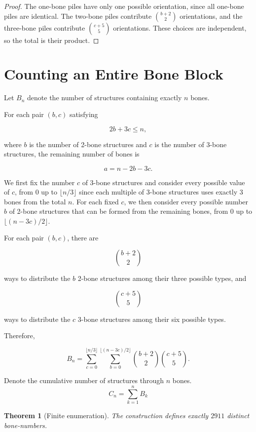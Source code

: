 \documentclass[11pt]{article}
\newtheorem{theorem}[definition]{Theorem}
\theoremstyle{remark}
\begin{document}
\begin{proof}
The one-bone piles have only one possible orientation, since all one-bone piles are identical. The two-bone piles contribute
\(\binom{b+2}{2}\) orientations, and the three-bone piles contribute
\(\binom{c+5}{5}\) orientations. These choices are independent, so the total is
their product.
\end{proof}

\section{Counting an Entire Bone Block}

Let \(B_n\) denote the number of structures containing exactly \(n\) bones.

\bigskip
For each pair \((b,c)\) satisfying

$$
2b+3c\leq n,
$$

where \(b\) is the number of 2-bone structures and \(c\) is the number of 3-bone structures, the remaining number of bones is

$$
a=n-2b-3c.
$$

We first fix the number \(c\) of 3-bone structures and consider every possible value of \(c\), from \(0\) up to \(\lfloor n/3\rfloor\) since each multiple of 3-bone structures uses exactly 3 bones from the total \(n\). For each fixed \(c\), we then consider every possible number \(b\) of 2-bone structures that can be formed from the remaining bones, from \(0\) up to \(\lfloor(n-3c)/2\rfloor\).

\bigskip
For each pair \((b,c)\), there are

$$
\binom{b+2}{2}
$$

ways to distribute the \(b\) 2-bone structures among their three possible types, and

$$
\binom{c+5}{5}
$$

ways to distribute the \(c\) 3-bone structures among their six possible types.

\bigskip
Therefore,

$$
\boxed{
B_n=
\sum_{c=0}^{\lfloor n/3\rfloor}
\sum_{b=0}^{\lfloor (n-3c)/2\rfloor}
\binom{b+2}{2}\binom{c+5}{5}
}.
$$

\bigskip
Denote the cumulative number of structures through \(n\) bones.
\[
C_n=\sum_{k=1}^{n}B_k
\]

\begin{theorem}[Finite enumeration]
The construction defines exactly \(2911\) distinct bone-numbers.
\end{theorem}
\end{document}
